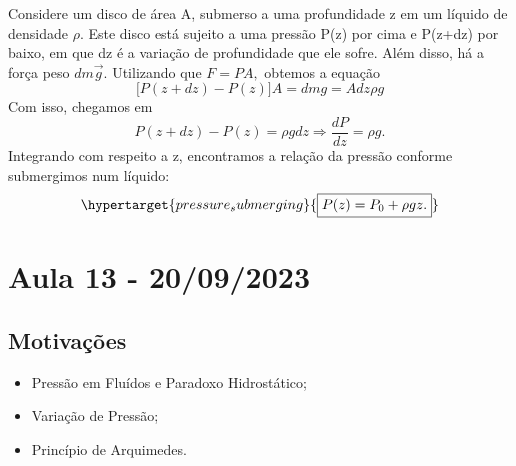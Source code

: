 \documentclass{article}
\begin{document}
  Considere um disco de área A, submerso a uma profundidade z em um líquido de densidade \(\rho \).
Este disco está sujeito a uma pressão P(z) por cima e P(z+dz) por baixo, em que dz é a variação de profundidade que ele sofre.
Além disso, há a força peso \(dm \vec{g}\). Utilizando que \(F = P A,\) obtemos a equação 
  \[
    \biggl[P(z+dz) - P(z)\biggr]A = dmg = Adz\rho g
  \]
Com isso, chegamos em 
  \[
    P(z+dz) - P(z) = \rho g dz \Rightarrow \frac{dP}{dz} = \rho g.
  \]
  Integrando com respeito a z, encontramos a relação da pressão conforme submergimos num líquido: 
    \[
      \hypertarget{pressure_submerging}{\boxed{P(z) = P_{0}+\rho gz.}}
    \]
\newpage

\section{Aula 13 - 20/09/2023}
\subsection{Motivações}
\begin{itemize}
  \item Pressão em Fluídos e Paradoxo Hidrostático;
  \item Variação de Pressão;
  \item Princípio de Arquimedes.
\end{itemize}
\end{document}
